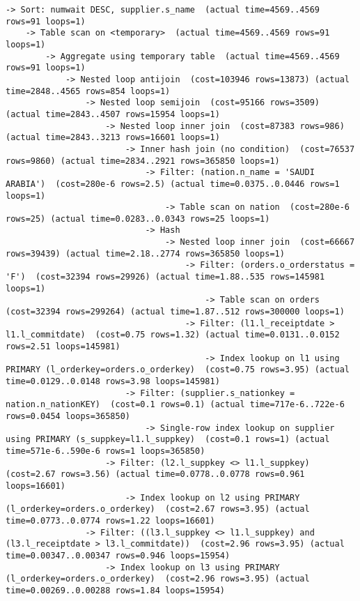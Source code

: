 \documentclass{article}
\begin{document}
\begin{lstlisting}
-> Sort: numwait DESC, supplier.s_name  (actual time=4569..4569 rows=91 loops=1)
    -> Table scan on <temporary>  (actual time=4569..4569 rows=91 loops=1)
        -> Aggregate using temporary table  (actual time=4569..4569 rows=91 loops=1)
            -> Nested loop antijoin  (cost=103946 rows=13873) (actual time=2848..4565 rows=854 loops=1)
                -> Nested loop semijoin  (cost=95166 rows=3509) (actual time=2843..4507 rows=15954 loops=1)
                    -> Nested loop inner join  (cost=87383 rows=986) (actual time=2843..3213 rows=16601 loops=1)
                        -> Inner hash join (no condition)  (cost=76537 rows=9860) (actual time=2834..2921 rows=365850 loops=1)
                            -> Filter: (nation.n_name = 'SAUDI ARABIA')  (cost=280e-6 rows=2.5) (actual time=0.0375..0.0446 rows=1 loops=1)
                                -> Table scan on nation  (cost=280e-6 rows=25) (actual time=0.0283..0.0343 rows=25 loops=1)
                            -> Hash
                                -> Nested loop inner join  (cost=66667 rows=39439) (actual time=2.18..2774 rows=365850 loops=1)
                                    -> Filter: (orders.o_orderstatus = 'F')  (cost=32394 rows=29926) (actual time=1.88..535 rows=145981 loops=1)
                                        -> Table scan on orders  (cost=32394 rows=299264) (actual time=1.87..512 rows=300000 loops=1)
                                    -> Filter: (l1.l_receiptdate > l1.l_commitdate)  (cost=0.75 rows=1.32) (actual time=0.0131..0.0152 rows=2.51 loops=145981)
                                        -> Index lookup on l1 using PRIMARY (l_orderkey=orders.o_orderkey)  (cost=0.75 rows=3.95) (actual time=0.0129..0.0148 rows=3.98 loops=145981)
                        -> Filter: (supplier.s_nationkey = nation.n_nationKEY)  (cost=0.1 rows=0.1) (actual time=717e-6..722e-6 rows=0.0454 loops=365850)
                            -> Single-row index lookup on supplier using PRIMARY (s_suppkey=l1.l_suppkey)  (cost=0.1 rows=1) (actual time=571e-6..590e-6 rows=1 loops=365850)
                    -> Filter: (l2.l_suppkey <> l1.l_suppkey)  (cost=2.67 rows=3.56) (actual time=0.0778..0.0778 rows=0.961 loops=16601)
                        -> Index lookup on l2 using PRIMARY (l_orderkey=orders.o_orderkey)  (cost=2.67 rows=3.95) (actual time=0.0773..0.0774 rows=1.22 loops=16601)
                -> Filter: ((l3.l_suppkey <> l1.l_suppkey) and (l3.l_receiptdate > l3.l_commitdate))  (cost=2.96 rows=3.95) (actual time=0.00347..0.00347 rows=0.946 loops=15954)
                    -> Index lookup on l3 using PRIMARY (l_orderkey=orders.o_orderkey)  (cost=2.96 rows=3.95) (actual time=0.00269..0.00288 rows=1.84 loops=15954)
\end{lstlisting}
\end{document}
